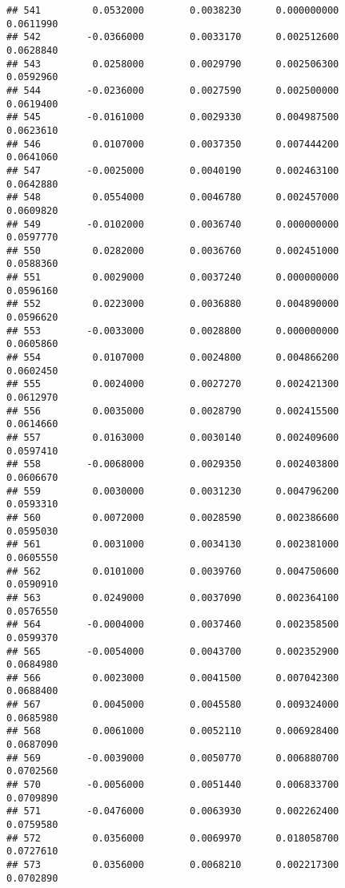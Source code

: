 \documentclass[
]{article}
\begin{document}
\begin{verbatim}
## 541         0.0532000        0.0038230      0.000000000             0.0611990
## 542        -0.0366000        0.0033170      0.002512600             0.0628840
## 543         0.0258000        0.0029790      0.002506300             0.0592960
## 544        -0.0236000        0.0027590      0.002500000             0.0619400
## 545        -0.0161000        0.0029330      0.004987500             0.0623610
## 546         0.0107000        0.0037350      0.007444200             0.0641060
## 547        -0.0025000        0.0040190      0.002463100             0.0642880
## 548         0.0554000        0.0046780      0.002457000             0.0609820
## 549        -0.0102000        0.0036740      0.000000000             0.0597770
## 550         0.0282000        0.0036760      0.002451000             0.0588360
## 551         0.0029000        0.0037240      0.000000000             0.0596160
## 552         0.0223000        0.0036880      0.004890000             0.0596620
## 553        -0.0033000        0.0028800      0.000000000             0.0605860
## 554         0.0107000        0.0024800      0.004866200             0.0602450
## 555         0.0024000        0.0027270      0.002421300             0.0612970
## 556         0.0035000        0.0028790      0.002415500             0.0614660
## 557         0.0163000        0.0030140      0.002409600             0.0597410
## 558        -0.0068000        0.0029350      0.002403800             0.0606670
## 559         0.0030000        0.0031230      0.004796200             0.0593310
## 560         0.0072000        0.0028590      0.002386600             0.0595030
## 561         0.0031000        0.0034130      0.002381000             0.0605550
## 562         0.0101000        0.0039760      0.004750600             0.0590910
## 563         0.0249000        0.0037090      0.002364100             0.0576550
## 564        -0.0004000        0.0037460      0.002358500             0.0599370
## 565        -0.0054000        0.0043700      0.002352900             0.0684980
## 566         0.0023000        0.0041500      0.007042300             0.0688400
## 567         0.0045000        0.0045580      0.009324000             0.0685980
## 568         0.0061000        0.0052110      0.006928400             0.0687090
## 569        -0.0039000        0.0050770      0.006880700             0.0702560
## 570        -0.0056000        0.0051440      0.006833700             0.0709890
## 571        -0.0476000        0.0063930      0.002262400             0.0759580
## 572         0.0356000        0.0069970      0.018058700             0.0727610
## 573         0.0356000        0.0068210      0.002217300             0.0702890

\end{verbatim}
\end{document}
